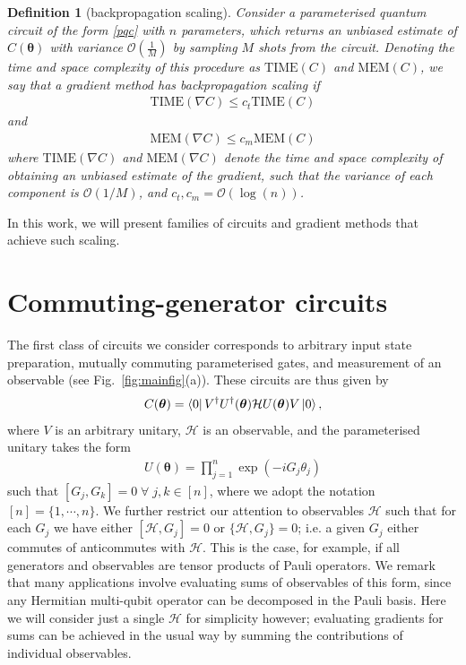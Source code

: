 \documentclass[twocolumn]{revtex4-2}
\newtheorem{definition}{Definition}[section]
\renewcommand{\vec}{\boldsymbol}
\begin{document}
\begin{definition}[backpropagation scaling]
    Consider a parameterised quantum circuit of the form \eqref{pqc} with $n$ parameters, which returns an unbiased estimate of $C(\vec{\theta})$ with variance $\mathcal{O}(\frac{1}{M})$ by sampling $M$ shots from the circuit. Denoting the time and space complexity of this procedure as $\text{TIME}(C)$ and $\text{MEM}(C)$, we say that a gradient method has backpropagation scaling if 
    \begin{align}
        \text{TIME}(\nabla C)\leq c_t \text{TIME}(C)
    \end{align}
    and 
    \begin{align}
        \text{MEM}(\nabla C)\leq c_m \text{MEM}(C)
    \end{align}
    where $\text{TIME}(\nabla C)$ and $\text{MEM}(\nabla C)$ denote the time and space complexity of obtaining an unbiased estimate of the gradient, such that the variance of each component is $\mathcal{O}(1/M)$, and $c_t,c_m= \mathcal{O}(\log(n))$.
\end{definition}
In this work, we will present families of circuits and gradient methods that achieve such scaling. 

\section{Commuting-generator circuits}\label{sec:commuting}
The first class of circuits we consider corresponds to arbitrary input state preparation, mutually commuting parameterised gates, and measurement of an observable (see Fig.\ \ref{fig:mainfig}(a)). These circuits are thus given by 
%
\begin{align}\label{ansatz}
    C(\vec{\theta}) = \bra{0}V^\dagger U^{\dagger}(\vec{\theta})\mathcal{H}U(\vec{\theta}) V\ket{0},
\end{align}
%
where $V$ is an arbitrary unitary, $\mathcal{H}$ is an observable, and the parameterised unitary takes the form 
%
\begin{align}
    U(\vec{\theta})=\prod_{j=1}^n \exp(-iG_j\theta_j)
\end{align}
%
such that $[G_j,G_k]=0\;\forall\;j,k\in[n]$, where we adopt the notation $[n] = \{1,\cdots,n\}$. We further restrict our attention to observables $\mathcal{H}$ such that for each $G_j$ we have either $[\mathcal{H},G_j]=0$ or $\{\mathcal{H},G_j\}=0$; i.e. a given $G_j$ either commutes of anticommutes with $\mathcal{H}$. This is the case, for example, if all generators and observables are tensor products of Pauli operators. We remark that many applications involve evaluating sums of observables of this form, since any Hermitian multi-qubit operator can be decomposed in the Pauli basis. Here we will consider just a single $\mathcal{H}$ for simplicity however; evaluating gradients for sums can be achieved in the usual way by summing the contributions of individual observables. 
\end{document}

